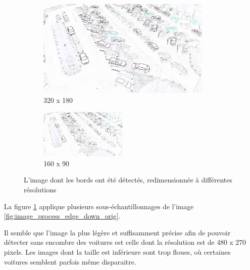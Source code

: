 \begin{figure}[H]
    \bigskip
    \begin{subfigure}{.5\textwidth}
        \centering
        \includegraphics[width=.85\linewidth]{img/conception/image_process/edge-downsample/1.png}
        \caption{320 x 180}
    \end{subfigure}%
    \begin{subfigure}{.5\textwidth}
        \centering
        \includegraphics[width=.85\linewidth]{img/conception/image_process/edge-downsample/0.png}
        \caption{160 x 90}
    \end{subfigure}%
    \centering
    \caption{L'image dont les bords ont été détectés, redimensionnée à différentes résolutions}
    \label{fig:image_process_edge_down}
\end{figure}

La figure \ref{fig:image_process_edge_down} applique plusieurs sous-échantillonnages de l'image \ref{fig:image_process_edge_down_orig}.

Il semble que l'image la plus légère et suffisamment précise afin de pouvoir détecter sans encombre des voitures est celle dont la résolution est de 480 x 270 pixels. Les images dont la taille est inférieure sont trop floues, où certaines voitures semblent parfois même disparaitre.

